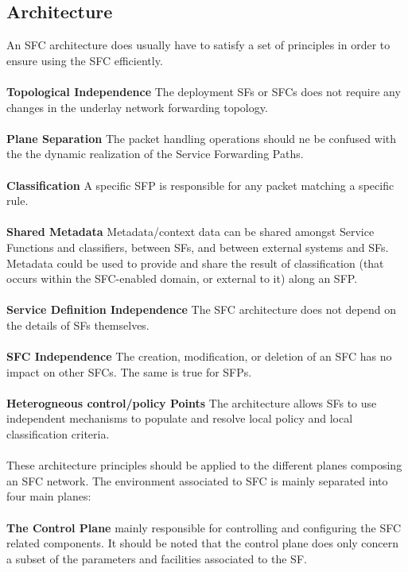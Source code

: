 \subsection{Architecture}
\vspace*{0.5cm}
An SFC architecture does usually have to satisfy a set of principles in order to ensure using the SFC efficiently.\\
\\
\textbf{Topological Independence} 
The deployment SFs or SFCs does not require any changes in the underlay network forwarding topology.\\
\\
\textbf{Plane Separation} The packet handling operations should ne be confused with the the dynamic realization of the Service Forwarding Paths.\\
\\
\textbf{Classification} A specific SFP is responsible for any packet matching a specific rule.\\
\\
\textbf{Shared Metadata} Metadata/context data can be shared amongst Service Functions and classifiers, between SFs, and between external systems and SFs. Metadata could be used to provide and share the result of classification (that occurs within the SFC-enabled domain, or external to it) along an SFP.\\
\\ 
\textbf{Service Definition Independence} The SFC architecture does not depend on the details of SFs themselves.\\
\\
\textbf{SFC Independence} The creation, modification, or deletion of an SFC has no impact on other SFCs. The same is true for SFPs.\\
\\
\textbf{Heterogneous control/policy Points} The architecture allows SFs
to use independent mechanisms to
populate and resolve local policy and  local classification criteria.\\
\\
These architecture principles should be applied to the  different planes composing an SFC network. The environment associated to SFC is mainly separated into four main planes:\\
\\
\textbf{The Control Plane} mainly responsible for controlling and configuring the SFC related components. It should be noted that the control plane does only concern a subset of the parameters and facilities associated to the SF.\\
